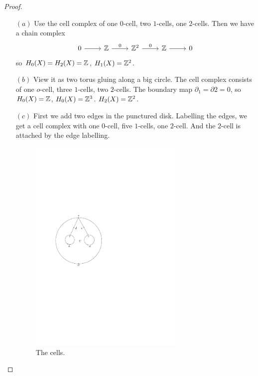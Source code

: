\begin{proof}
\mbox{}
\begin{itemize}
\item[$(a)$]Use the cell complex of one $0$-cell, two $1$-cells, one $2$-cells. Then we have a chain complex
\[\begin{tikzcd}
0\ar[r]&\Z\ar[r,"0"]&\Z^2\ar[r,"0"]&\Z\ar[r]&0
\end{tikzcd}\]
so $H_0(X)=H_2(X)=\mathbb{Z}$, $H_1(X)=\mathbb{Z}^2$.
\item[$(b)$]View it as two torus gluing along a big circle. The cell complex consists of one $o$-cell, three $1$-cells, two $2$-cells. The boundary map $\partial_1=\partial 2=0$, so $H_0(X)=\mathbb{Z}$, $H_0(X)=\mathbb{Z}^3$. $H_2(X)=\mathbb{Z}^2$.
\item[$(c)$]First we add two edges in the punctured disk. Labelling the edges, we get a cell complex with one $0$-cell, five $1$-cells, one $2$-cell. And the $2$-cell is attached by the edge labelling.
\begin{figure}[htpb]
\centering
\begin{minipage}{200pt}
\centering
\includegraphics[width=0.7\textwidth]{cell-1}
\caption{The cells.}
\end{minipage}
\hspace{20pt}
\begin{minipage}{200pt}
\centering

\end{minipage}
\end{figure}
\end{itemize}
\end{proof}

